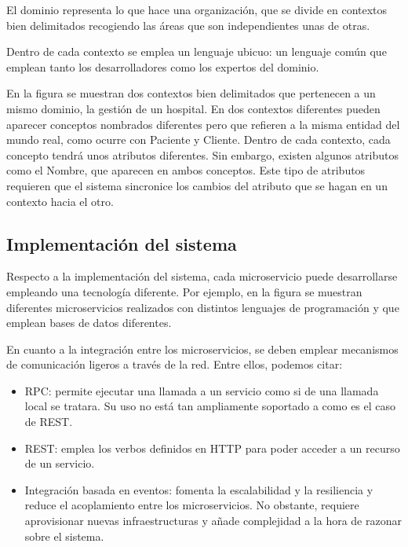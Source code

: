 \documentclass[11pt,a4paper]{article}
\begin{document}
El dominio representa lo que hace una organización, que se divide en contextos bien delimitados recogiendo las áreas que son independientes unas de otras. 

Dentro de cada contexto se emplea un lenguaje ubicuo: un lenguaje común que emplean tanto los desarrolladores como los expertos del dominio.

En la figura se muestran dos contextos bien delimitados que pertenecen a un mismo dominio, la gestión de un hospital. En dos contextos diferentes pueden aparecer conceptos nombrados diferentes pero que refieren a la misma entidad del mundo real, como ocurre con Paciente y Cliente. Dentro de cada contexto, cada concepto tendrá unos atributos diferentes. Sin embargo, existen algunos atributos como el Nombre, que aparecen en ambos conceptos. Este tipo de atributos requieren que el sistema sincronice los cambios del atributo que se hagan en un contexto hacia el otro.

\subsection{Implementación del sistema}

Respecto a la implementación del sistema, cada microservicio puede desarrollarse empleando una tecnología diferente. Por ejemplo, en la figura se muestran diferentes microservicios realizados con distintos lenguajes de programación y que emplean bases de datos diferentes.

En cuanto a la integración entre los microservicios, se deben emplear mecanismos de comunicación ligeros a través de la red. Entre ellos, podemos citar:

\begin{itemize}

\item RPC: permite ejecutar una llamada a un servicio como si de una llamada local se tratara. Su uso no está tan ampliamente soportado a como es el caso de REST.

\item REST: emplea los verbos definidos en HTTP para poder acceder a un recurso de un servicio.

\item Integración basada en eventos: fomenta la escalabilidad y la resiliencia  y reduce el acoplamiento entre los microservicios. No obstante, requiere aprovisionar nuevas infraestructuras y añade complejidad a la hora de razonar sobre el sistema.

\end{itemize}
\end{document}
